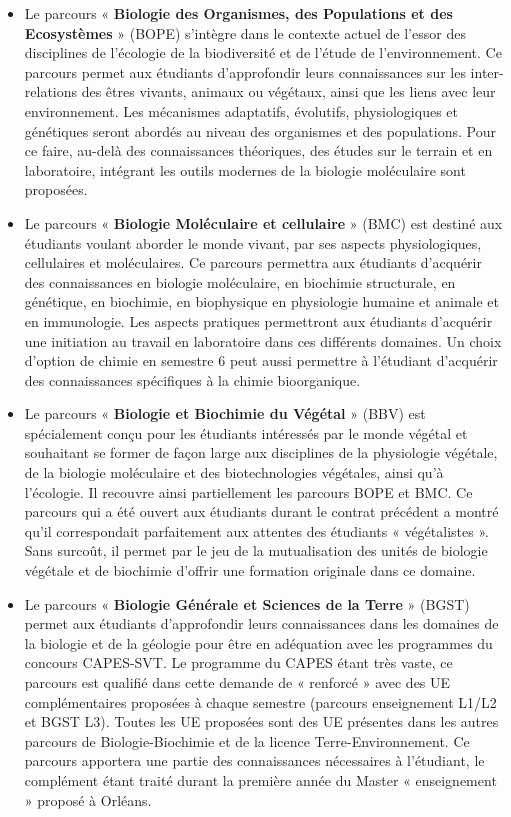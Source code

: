 \documentclass[10pt, a5paper]{report}
\begin{document}
\begin{spacing}{1.5}
\begin{itemize}
\item Le parcours « \textbf{Biologie des Organismes, des Populations et des Ecosystèmes} » (BOPE) s’intègre dans le contexte actuel de l’essor des disciplines de l’écologie de la biodiversité et de l’étude de l’environnement. Ce parcours permet aux étudiants d’approfondir leurs connaissances sur les inter-relations des êtres vivants, animaux ou végétaux, ainsi que les liens avec leur environnement. Les mécanismes adaptatifs, évolutifs, physiologiques et génétiques seront abordés au niveau des organismes et des populations. Pour ce faire, au-delà des connaissances théoriques, des études sur le terrain et en laboratoire, intégrant les outils modernes de la biologie moléculaire sont  proposées.
\item Le parcours « \textbf{Biologie Moléculaire et cellulaire} » (BMC) est destiné aux étudiants voulant aborder le monde vivant, par ses aspects physiologiques, cellulaires et moléculaires. Ce parcours permettra aux étudiants d’acquérir des connaissances en biologie moléculaire, en biochimie structurale, en génétique, en biochimie, en biophysique en physiologie humaine et animale et en immunologie. Les aspects pratiques permettront aux étudiants d’acquérir une initiation au travail en laboratoire dans ces différents domaines.  Un choix d’option de chimie en semestre 6 peut aussi permettre à l’étudiant d’acquérir des connaissances spécifiques à la chimie bioorganique.
\item Le parcours « \textbf{Biologie et Biochimie du Végétal} » (BBV) est spécialement conçu pour les étudiants intéressés par le monde végétal et souhaitant se former de façon large aux disciplines de la physiologie végétale, de la biologie moléculaire et des biotechnologies végétales, ainsi qu’à l’écologie.  Il recouvre ainsi partiellement les parcours BOPE et BMC. Ce parcours qui a été ouvert aux étudiants durant le contrat précédent a montré qu’il correspondait parfaitement aux attentes des étudiants « végétalistes ». Sans surcoût, il permet par le jeu de la mutualisation des unités de biologie végétale et de biochimie d’offrir une formation originale dans ce domaine.
\item Le parcours « \textbf{Biologie Générale et Sciences de la Terre} » (BGST) permet aux étudiants d’approfondir leurs connaissances dans les domaines de la biologie et de la géologie pour être en adéquation avec les programmes du concours CAPES-SVT. Le programme du CAPES étant très vaste, ce parcours est qualifié dans cette demande de « renforcé » avec des UE complémentaires proposées à chaque semestre (parcours enseignement L1/L2 et BGST L3). Toutes les UE proposées sont des UE présentes dans les autres parcours de Biologie-Biochimie et de la  licence Terre-Environnement.  Ce parcours apportera une partie des connaissances nécessaires à l’étudiant, le complément étant traité durant la première année du Master « enseignement » proposé à Orléans. 

\end{itemize}
\end{spacing}
\end{document}
